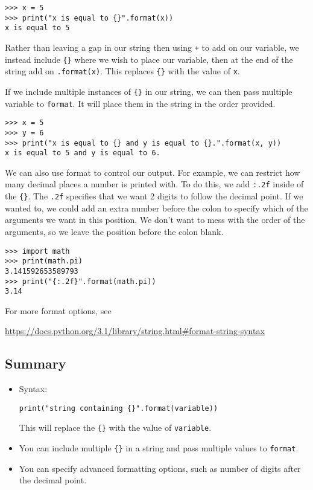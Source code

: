 \documentclass[11pt,hidelinks]{article}
\begin{document}
\begin{lstlisting}[style=ipython]
>>> x = 5
>>> print("x is equal to {}".format(x))
x is equal to 5
\end{lstlisting}

Rather than leaving a gap in our string then using \lstinline{+} to add on our variable, we instead include \lstinline!{}! where we wish to place our variable, then at the end of the string add on \lstinline{.format(x)}. This replaces \lstinline!{}! with the value of \lstinline{x}.

If we include multiple instances of \lstinline!{}! in our string, we can then pass multiple variable to \lstinline{format}. It will place them in the string in the order provided.

\begin{lstlisting}[style=ipython]
>>> x = 5
>>> y = 6
>>> print("x is equal to {} and y is equal to {}.".format(x, y))
x is equal to 5 and y is equal to 6.
\end{lstlisting}

We can also use format to control our output. For example, we can restrict how many decimal places a number is printed with. To do this, we add \lstinline{:.2f} inside of the \lstinline!{}!. The \lstinline{.2f} specifies that we want 2 digits to follow the decimal point. If we wanted to, we could add an extra number before the colon to specify which of the arguments we want in this position. We don't want to mess with the order of the arguments, so we leave the position before the colon blank.

\begin{lstlisting}[style=ipython]
>>> import math
>>> print(math.pi)
3.141592653589793
>>> print("{:.2f}".format(math.pi))
3.14
\end{lstlisting}

For more format options, see
\begin{center}
  \vspace{-2mm}
\url{https://docs.python.org/3.1/library/string.html#format-string-syntax}
\vspace{-2mm}

\end{center}

\subsection{Summary}

\begin{itemize}
  \item Syntax:
    \begin{lstlisting}
print("string containing {}".format(variable))
    \end{lstlisting}
    
    This will replace the \lstinline!{}! with the value of \lstinline{variable}.
    
  \item You can include multiple \lstinline!{}! in a string and pass multiple values to \lstinline{format}.

  \item You can specify advanced formatting options, such as number of digits after the decimal point.
\end{itemize}
\end{document}
